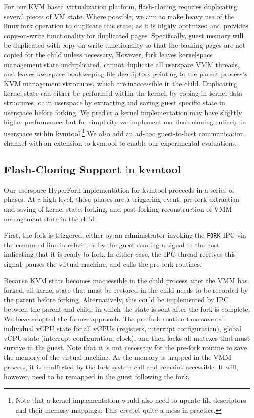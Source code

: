 For our KVM based virtualization platform, flash-cloning requires duplicating
several pieces of VM state. Where possible, we aim to make heavy use of the
linux fork operation to duplicate this state, as it is highly optimized and
provides copy-on-write functionality for duplicated pages. Specifically, guest
memory will be duplicated with copy-on-write functionality so that the backing
pages are not copied for the child unless necessary. However, fork leaves
kernelspace management state unduplicated, cannot duplicate all userspace VMM
threads, and leaves userspace bookkeeping file descriptors pointing to the
parent process's KVM management structures, which are inaccessible in the
child. Duplicating kernel state can either be performed within the kernel, by
coping in-kernel data structures, or in userspace by extracting and saving
guest specific state in userspace before forking. We predict a kernel
implementation may have slightly higher performance, but for simplicity we
implement our flash-cloning entirely in userspace within kvmtool.\footnote{Note
that a kernel implementation would also need to update file descriptors and
their memory mappings. This creates quite a mess in practice.} We also add an
ad-hoc guest-to-host communication channel with an extension to kvmtool to
enable our experimental evaluations.

\subsection{Flash-Cloning Support in kvmtool}

Our userspace HyperFork implementation for kvmtool proceeds in a series of
phases. At a high level, these phases are a triggering event, pre-fork
extraction and saving of kernel state, forking, and post-forking reconstruction
of VMM management state in the child.

First, the fork is triggered, either by an administrator invoking the
\texttt{FORK} IPC via the command line interface, or by the guest sending a
signal to the host indicating that it is ready to fork. In either case, the IPC
thread receives this signal, pauses the virtual machine, and calls the pre-fork
routines.

Because KVM state becomes inaccessible in the child process after the VMM has
forked, all kernel state that must be restored in the child needs to be
recorded by the parent before forking. Alternatively, this could be implemented
by IPC between the parent and child, in which the state is sent after the fork
is complete. We have adopted the former approach. The pre-fork routine thus
saves all individual vCPU state for all vCPUs (registers, interrupt
configuration), global vCPU state (interrupt configuration, clock), and then
locks all mutexes that must survive in the guest. Note that it is not necessary
for the pre-fork routine to save the memory of the virtual machine. As the
memory is mapped in the VMM process, it is unaffected by the fork system call
and remains accessible. It will, however, need to be remapped in the guest
following the fork.


